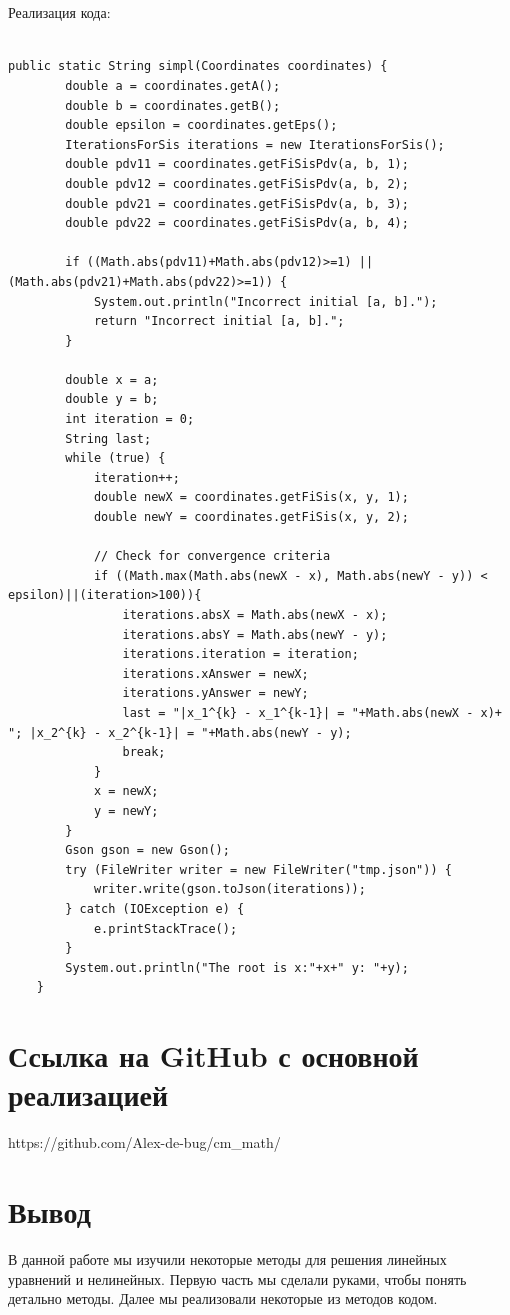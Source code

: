 \documentclass{article}
\begin{document}
\\ \\
Реализация кода:
\\ \\
\begin{lstlisting}[frame=single, basicstyle=\ttfamily, breaklines=true, breakatwhitespace=true, postbreak=\mbox{\textcolor{red}{$\hookrightarrow$}\space}]
    public static String simpl(Coordinates coordinates) {
        double a = coordinates.getA();
        double b = coordinates.getB();
        double epsilon = coordinates.getEps();
        IterationsForSis iterations = new IterationsForSis();
        double pdv11 = coordinates.getFiSisPdv(a, b, 1);
        double pdv12 = coordinates.getFiSisPdv(a, b, 2);
        double pdv21 = coordinates.getFiSisPdv(a, b, 3);
        double pdv22 = coordinates.getFiSisPdv(a, b, 4);

        if ((Math.abs(pdv11)+Math.abs(pdv12)>=1) || (Math.abs(pdv21)+Math.abs(pdv22)>=1)) {
            System.out.println("Incorrect initial [a, b].");
            return "Incorrect initial [a, b].";
        }

        double x = a;
        double y = b;
        int iteration = 0;
        String last;
        while (true) {
            iteration++;
            double newX = coordinates.getFiSis(x, y, 1);
            double newY = coordinates.getFiSis(x, y, 2);

            // Check for convergence criteria
            if ((Math.max(Math.abs(newX - x), Math.abs(newY - y)) < epsilon)||(iteration>100)){
                iterations.absX = Math.abs(newX - x);
                iterations.absY = Math.abs(newY - y);
                iterations.iteration = iteration;
                iterations.xAnswer = newX;
                iterations.yAnswer = newY;
                last = "|x_1^{k} - x_1^{k-1}| = "+Math.abs(newX - x)+ "; |x_2^{k} - x_2^{k-1}| = "+Math.abs(newY - y);
                break;
            }
            x = newX;
            y = newY;
        }
        Gson gson = new Gson();
        try (FileWriter writer = new FileWriter("tmp.json")) {
            writer.write(gson.toJson(iterations));
        } catch (IOException e) {
            e.printStackTrace();
        }
        System.out.println("The root is x:"+x+" y: "+y);
    }
\end{lstlisting}
\section{Ссылка на GitHub с основной реализацией}
https://github.com/Alex-de-bug/cm\_math/
\section{Вывод}
    В данной работе мы изучили некоторые методы для решения линейных уравнений и нелинейных. Первую часть мы сделали руками, чтобы понять детально методы. Далее мы реализовали некоторые из методов кодом.
\end{document}
